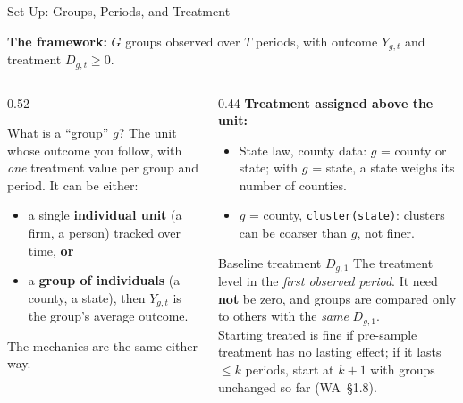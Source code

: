 \documentclass[main.tex]{subfiles}
\begin{document}
\begin{frame}{Set-Up: Groups, Periods, and Treatment}

  \textbf{The framework:} $G$ groups observed over $T$ periods, with
  outcome $Y_{g,t}$ and treatment $D_{g,t} \geq 0$.

  \medskip
  \begin{columns}[T]
    \begin{column}{0.52\textwidth}
      \begin{block}{What is a ``group'' $g$?}
        \small
        The unit whose outcome you follow, with \emph{one} treatment value
        per group and period. It can be \alert{either}:
        \begin{itemize}\small
          \item a single \textbf{individual unit} (a firm, a person)
            tracked over time, \textbf{or}
          \item a \textbf{group of individuals} (a county, a state),
            then $Y_{g,t}$ is the group's average outcome.
        \end{itemize}
        The mechanics are the same either way.
      \end{block}
    \end{column}
    \begin{column}{0.44\textwidth}
      \textbf{Treatment assigned above the unit:}
      \begin{itemize}\small
        \item State law, county data: $g$ = county or state; with
          $g$ = state, a state weighs its number of counties.
        \item $g$ = county, \texttt{cluster(state)}: clusters
          can be coarser than $g$, not finer.
      \end{itemize}

      \smallskip
      \begin{block}{\footnotesize Baseline treatment $D_{g,1}$}
        \footnotesize
        The treatment level in the \emph{first observed period}.
        It need \textbf{not} be zero, and groups are compared
        only to others with the \emph{same} $D_{g,1}$.\\[3pt]
        Starting treated is fine if pre-sample treatment has no lasting
        effect; if it lasts $\le k$ periods, start at $k{+}1$ with groups
        unchanged so far (WA~\S1.8).
      \end{block}
    \end{column}
  \end{columns}

\end{frame}
\end{document}
